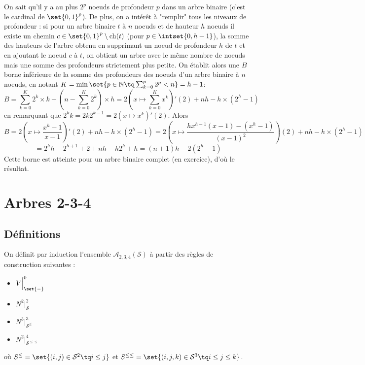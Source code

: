 \documentclass{scrartcl}
\begin{document}
			\begin{demo}
				\item On sait qu'il y a au plus $2^p$ noeuds de profondeur $p$ dans un arbre binaire (c'est le cardinal de $\set{0,1}^p$).
					De plus, on a intérêt à "remplir" tous les niveaux de profondeur : si pour un arbre binaire $t$ à $n$ noeuds et de hauteur $h$ noeuds il existe un chemin $c \in \set{0,1}^p\setminus\mathrm{ch}(t)$ (pour $p \in \intset{0,h-1}$), la somme des hauteurs de l'arbre obtenu en supprimant un noeud de profondeur $h$ de $t$ et en ajoutant le noeud $c$ à $t$, on obtient un arbre avec le même nombre de noeuds mais une somme des profondeurs strictement plus petite.
					On établit alors une $B$ borne inférieure de la somme des profondeurs des noeuds d'un arbre binaire à $n$ noeuds, en notant $K = \min\set{p \in \mathbb{N} \tq \sum_{k=0}^p 2^p < n} = h-1$: 
				\[
					B = \sum_{k=0}^K 2^k\times k + (n-\sum_{k=0}^K 2^k)\times h = 2\left(x\mapsto \sum_{k=0}^K x^k\right)'(2) + nh - h\times(2^h - 1)
				\]
				en remarquant que $2^kk = 2 k 2^{k-1} = 2\left(x \mapsto x^k\right)'(2)$. Alors
				\[
					B = 2\left(x\mapsto \frac{x^h-1}{x-1} \right)'(2) + nh - h\times(2^h - 1) = 2\left(x\mapsto\frac{hx^{h-1}(x-1) - (x^h-1)}{(x-1)^2}\right)(2) + nh - h\times(2^h - 1)
				\]
				\[
					= 2^hh-2^{h+1}+2 + nh - h2^h + h = (n+1)h - 2(2^h-1)
				\]
				Cette borne est atteinte pour un arbre binaire complet (en exercice), d'où le résultat.
			\end{demo}
	\section{Arbres 2-3-4}
		\subsection{Définitions}
			On définit par induction l'ensemble $\mathscr{A}_{2,3,4}(\mathcal{S})$ à partir des règles de construction suivantes :
			\begin{multicols}{4}
			\begin{itemize}
				\item $V\Big|_{\set{-}}^0$ 
				\item $N^2\Big|_{\mathcal{S}}^2$ 
				\item $N^3\Big|_{\mathcal{S}^\leq}^3$ 
				\item $N^2\Big|_{\mathcal{S}^{\leq\leq}}^4$ 
			\end{itemize}
			\end{multicols}
			où $S^\leq = \set{(i,j) \in \mathcal{S}^2 \tq i \leq j}$ et $S^{\leq\leq} = \set{(i,j,k) \in \mathcal{S}^3 \tq i \leq j \leq k}$.
\end{document}
